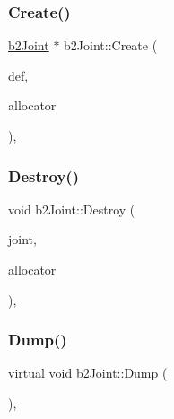 \subsubsection{\texorpdfstring{Create()}{Create()}}
{\footnotesize\ttfamily \mbox{\hyperlink{classb2_joint}{b2\+Joint}} $\ast$ b2\+Joint\+::\+Create (\begin{DoxyParamCaption}\item[{const \mbox{\hyperlink{structb2_joint_def}{b2\+Joint\+Def}} $\ast$}]{def,  }\item[{\mbox{\hyperlink{classb2_block_allocator}{b2\+Block\+Allocator}} $\ast$}]{allocator }\end{DoxyParamCaption})\hspace{0.3cm}{\ttfamily [static]}, {\ttfamily [protected]}}

\mbox{\label{classb2_joint_acf52946b6672d77f268b849ccb09e003}} 
\subsubsection{\texorpdfstring{Destroy()}{Destroy()}}
{\footnotesize\ttfamily void b2\+Joint\+::\+Destroy (\begin{DoxyParamCaption}\item[{\mbox{\hyperlink{classb2_joint}{b2\+Joint}} $\ast$}]{joint,  }\item[{\mbox{\hyperlink{classb2_block_allocator}{b2\+Block\+Allocator}} $\ast$}]{allocator }\end{DoxyParamCaption})\hspace{0.3cm}{\ttfamily [static]}, {\ttfamily [protected]}}

\mbox{\label{classb2_joint_abd35e7316017ad9a40d5dbf9b5ba3f36}} 
\subsubsection{\texorpdfstring{Dump()}{Dump()}}
{\footnotesize\ttfamily virtual void b2\+Joint\+::\+Dump (\begin{DoxyParamCaption}{ }\end{DoxyParamCaption})\hspace{0.3cm}{\ttfamily [inline]}, {\ttfamily [virtual]}}



